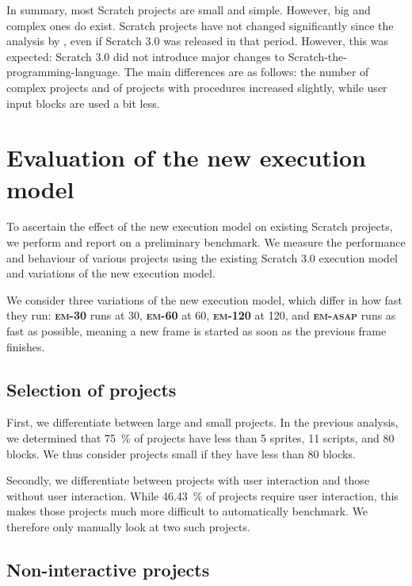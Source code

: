 \documentclass[../main]{subfiles}
\begin{document}
In summary, most Scratch projects are small and simple.
However, big and complex ones do exist.
Scratch projects have not changed significantly since the analysis by \textcite{aivaloglouHowKidsCode2016}, even if Scratch 3.0 was released in that period.
However, this was expected: Scratch 3.0 did not introduce major changes to Scratch-the-programming-language.
The main differences are as follows: the number of complex projects and of projects with procedures increased slightly, while user input blocks are used a bit less.

\section{Evaluation of the new execution model}\label{sec:evaluation-of-the-new-execution-model}

To ascertain the effect of the new execution model on existing Scratch projects, we perform and report on a preliminary benchmark.
We measure the performance and behaviour of various projects using the existing Scratch 3.0 execution model and variations of the new execution model.

We consider three variations of the new execution model, which differ in how fast they run: \textbf{\textsc{em-30}} runs at \qty{30}{\fps}, \textbf{\textsc{em-60}} at \qty{60}{\fps}, \textbf{\textsc{em-120}} at \qty{120}{\fps}, and \textbf{\textsc{em-asap}} runs as fast as possible, meaning a new frame is started as soon as the previous frame finishes.

\subsection{Selection of projects}\label{subsec:selection-of-projects}

First, we differentiate between large and small projects.
In the previous analysis, we determined that \qty{75}{\percent} of projects have less than 5 sprites, 11 scripts, and 80 blocks.
We thus consider projects small if they have less than 80 blocks.

Secondly, we differentiate between projects with user interaction and those without user interaction.
While \qty{46.43}{\percent} of projects require user interaction, this makes those projects much more difficult to automatically benchmark.
We therefore only manually look at two such projects.

\subsection{Non-interactive projects}\label{subsec:non-interactive-projects}
\end{document}
